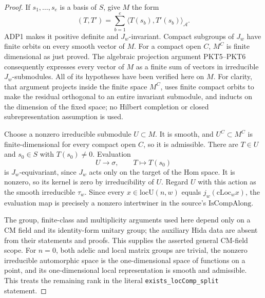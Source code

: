 \documentclass[11pt,a4paper]{article}
\numberwithin{equation}{section}
\theoremstyle{remark}\newtheorem{remark}[theorem]{Remark}
\begin{document}
\begin{proof}
If \(s_1,\ldots,s_e\) is a basis of \(S\), give \(M\) the form
\[
            (T,T')=\sum_{b=1}^e
                         \langle T(s_b),T'(s_b)\rangle_{\mathcal A}.
\]
ADP1 makes it positive definite and \(J_w\)-invariant.
Compact subgroups of \(J_w\) have finite orbits on every smooth
vector of \(M\).  For a compact open \(C\), \(M^C\) is finite
dimensional as just proved.  The algebraic projection argument
PKT5--PKT6 consequently expresses every vector of \(M\) as a
finite sum of vectors in irreducible \(J_w\)-submodules.
All of its hypotheses have been verified here on \(M\).
For clarity, that argument projects inside the finite space
\(M^C\), uses finite compact orbits to make the residual
orthogonal to an entire invariant submodule, and inducts on the
dimension of the fixed space; no Hilbert completion or closed
subrepresentation assumption is used.

Choose a nonzero irreducible submodule \(U\subset M\).
It is smooth, and \(U^C\subset M^C\) is finite-dimensional for
every compact open \(C\), so it is admissible.
There are \(T\in U\) and \(s_0\in S\) with \(T(s_0)\ne0\).
Evaluation
\[
                       U\longrightarrow\sigma,\qquad
                                T\longmapsto T(s_0)
\]
is \(J_w\)-equivariant, since \(J_w\) acts only on the target
of the Hom space.  It is nonzero, so its kernel is zero by
irreducibility of \(U\).  Regard \(U\) with this action as the
smooth irreducible \(\tau_w\).  Since every
\(x\in\mathrm{locU}(n,w)\) equals \(j_w(\mathrm{cLoc}_w x)\),
the evaluation map is precisely a nonzero intertwiner in the
source's \(\mathrm{IsCompAlong}\).

The group, finite-class and multiplicity arguments used here
depend only on a CM field and its identity-form unitary group;
the auxiliary Hida data are absent from their statements and
proofs.  This supplies the asserted general CM-field scope.
For \(n=0\), both adelic and local matrix groups are trivial,
the nonzero irreducible automorphic space is the one-dimensional
space of functions on a point, and its one-dimensional local
representation is smooth and admissible.  This treats the
remaining rank in the literal \texttt{exists\_\allowbreak loc\allowbreak Comp\_\allowbreak split}
statement.
\end{proof}

\end{document}
